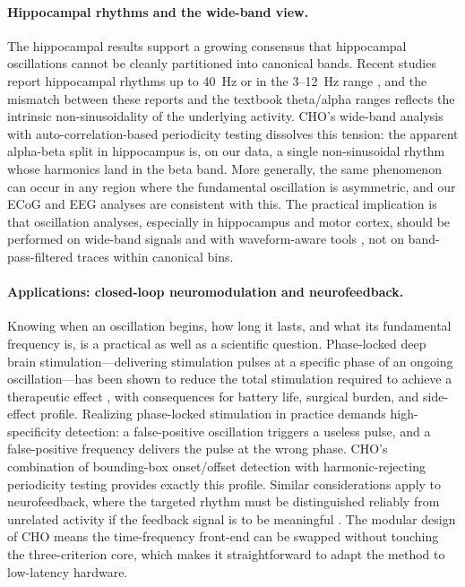 \documentclass[11pt]{article}
\begin{document}
\paragraph{Hippocampal rhythms and the wide-band view.}
The hippocampal results support a growing consensus that hippocampal oscillations cannot be cleanly partitioned into canonical bands. Recent studies report hippocampal rhythms up to 40~Hz \citep{cole2019cycle} or in the 3--12~Hz range \citep{cole2017waveform}, and the mismatch between these reports and the textbook theta/alpha ranges \citep{buzsaki2004neuronal} reflects the intrinsic non-sinusoidality of the underlying activity. CHO's wide-band analysis with auto-correlation-based periodicity testing dissolves this tension: the apparent alpha-beta split in hippocampus is, on our data, a single non-sinusoidal rhythm whose harmonics land in the beta band. More generally, the same phenomenon can occur in any region where the fundamental oscillation is asymmetric, and our ECoG and EEG analyses are consistent with this. The practical implication is that oscillation analyses, especially in hippocampus and motor cortex, should be performed on wide-band signals and with waveform-aware tools \citep{donoghue2022methodological,quinn2021within}, not on band-pass-filtered traces within canonical bins.

\paragraph{Applications: closed-loop neuromodulation and neurofeedback.}
Knowing when an oscillation begins, how long it lasts, and what its fundamental frequency is, is a practical as well as a scientific question. Phase-locked deep brain stimulation---delivering stimulation pulses at a specific phase of an ongoing oscillation---has been shown to reduce the total stimulation required to achieve a therapeutic effect \citep{cagnan2017phase}, with consequences for battery life, surgical burden, and side-effect profile. Realizing phase-locked stimulation in practice demands high-specificity detection: a false-positive oscillation triggers a useless pulse, and a false-positive frequency delivers the pulse at the wrong phase. CHO's combination of bounding-box onset/offset detection with harmonic-rejecting periodicity testing provides exactly this profile. Similar considerations apply to neurofeedback, where the targeted rhythm must be distinguished reliably from unrelated activity if the feedback signal is to be meaningful \citep{jensen2010shaping}. The modular design of CHO means the time-frequency front-end can be swapped without touching the three-criterion core, which makes it straightforward to adapt the method to low-latency hardware.
\end{document}
